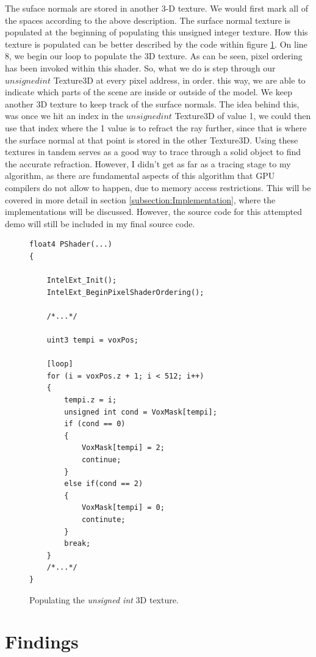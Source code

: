 \documentclass[a4paper, 12pt]{article}
\begin{document}
\noindent The suface normals are stored in another 3-D texture. We would first
mark all of the spaces according to the above description. The surface normal
texture is populated at the beginning of populating this unsigned integer
texture. How this texture is populated can be better described by the code
within figure \ref{code:3DTexPop}. On line 8, we begin our loop to populate
the 3D texture. As can be seen, pixel ordering has been invoked within this
shader. So, what we do is step through our $unsigned int$ Texture3D at every
pixel address, in order. this way, we are able to indicate which parts of the
scene are inside or outside of the model. We keep another 3D texture to keep
track of the surface normals. The idea behind this, was once we hit an index
in the $unsigned int$ Texture3D of value 1, we could then use that index where
the 1 value is to refract the ray further, since that is where the surface
normal at that point is stored in the other Texture3D. Using these textures in
tandem serves as a good way to trace through a solid object to find the
accurate refraction. However, I didn't get as far as a tracing stage to my
algorithm, as there are fundamental aspects of this algorithm that GPU
compilers do not allow to happen, due to memory access restrictions. This will
be covered in more detail in section \ref{subsection:Implementation}, where
the implementations will be discussed. However, the source code for this
attempted demo will still be included in my final source code.

\begin{figure}[h]
\begin{lstlisting}[breaklines=true,language=HLSL]
float4 PShader(...)
{

	IntelExt_Init();
	IntelExt_BeginPixelShaderOrdering();

	/*...*/

	uint3 tempi = voxPos;

	[loop]
	for (i = voxPos.z + 1; i < 512; i++)
	{
		tempi.z = i;
		unsigned int cond = VoxMask[tempi];
		if (cond == 0)
		{
			VoxMask[tempi] = 2;
			continue;
		}
		else if(cond == 2)
		{
			VoxMask[tempi] = 0;
			continute;
		}
		break;
	}
	/*...*/
}
\end{lstlisting}
\caption{Populating the \textit{unsigned int} 3D texture.}
\label{code:3DTexPop}
\end{figure}

\section{Findings}
\end{document}

